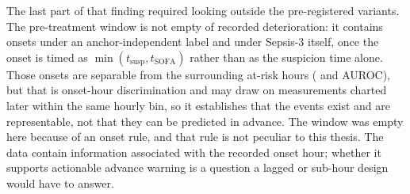 The last part of that finding required looking outside the pre-registered
variants. The pre-treatment window is not empty of recorded deterioration: it
contains \pcPreTreatOnsetsVarD{} onsets under an anchor-independent label and
\pcPreTreatOnsetsVarF{} under Sepsis-3 itself, once the onset is timed as
$\min(t_{\text{susp}}, t_{\text{SOFA}})$ rather than as the suspicion time
alone. Those onsets are separable from the surrounding at-risk hours
(\pcPreTreatAurocPrimaryD{} and \pcPreTreatAurocPrimaryF{} AUROC), but that is
onset-hour discrimination and may draw on measurements charted later within the
same hourly bin, so it establishes that the events exist and are representable,
not that they can be predicted in advance. The window was empty here because of
an onset rule, and that rule is not peculiar to this thesis. The data contain
information associated with the recorded onset hour; whether it supports
actionable advance warning is a question a lagged or sub-hour design would have
to answer.
